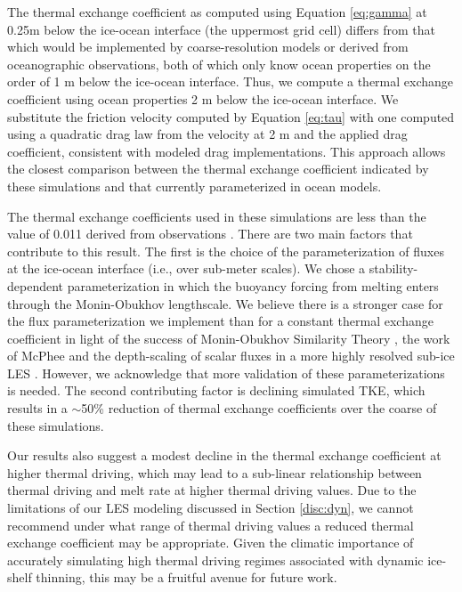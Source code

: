 \documentclass[draft]{agujournal2019}
\begin{document}
The thermal exchange coefficient as computed using Equation \ref{eq:gamma} at 0.25m below the ice-ocean interface (the uppermost grid cell) differs from that which would be implemented by coarse-resolution models or derived from oceanographic observations, both of which only know ocean properties on the order of 1 m below the ice-ocean interface. Thus, we compute a thermal exchange coefficient using ocean properties 2 m below the ice-ocean interface. We substitute the friction velocity computed by Equation \ref{eq:tau} with one computed using a quadratic drag law from the velocity at 2 m and the applied drag coefficient, consistent with modeled drag implementations. This approach allows the closest comparison between the thermal exchange coefficient indicated by these simulations and that currently parameterized in ocean models. 

The thermal exchange coefficients used in these simulations are less than the value of 0.011 derived from observations \cite{jenkins_observation_2010}. There are two main factors that contribute to this result. The first is the choice of the parameterization of fluxes at the ice-ocean interface (i.e., over sub-meter scales). We chose a stability-dependent parameterization in which the buoyancy forcing from melting enters through the Monin-Obukhov lengthscale. We believe there is a stronger case for the flux parameterization we implement than for a constant thermal exchange coefficient in light of the success of Monin-Obukhov Similarity Theory \cite{monin_basic_1954}, the work of McPhee \cite{mcphee_air-ice-ocean_2008} and the depth-scaling of scalar fluxes in a more highly resolved sub-ice LES \cite{vreugdenhil_stratification_2019}. However, we acknowledge that more validation of these parameterizations is needed. The second contributing factor is declining simulated TKE, which results in a $\sim$50\% reduction of thermal exchange coefficients over the coarse of these simulations. 

Our results also suggest a modest decline in the thermal exchange coefficient at higher thermal driving, which may lead to a sub-linear relationship between thermal driving and melt rate at higher thermal driving values. Due to the limitations of our LES modeling discussed in Section \ref{disc:dyn}, we cannot recommend under what range of thermal driving values a reduced thermal exchange coefficient may be appropriate. Given the climatic importance of accurately simulating high thermal driving regimes associated with dynamic ice-shelf thinning, this may be a fruitful avenue for future work.
\end{document}
